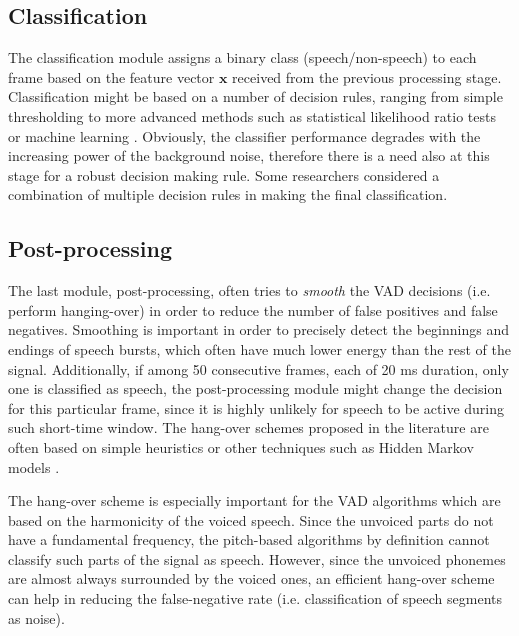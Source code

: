\subsection{Classification}

The classification module assigns a binary class (speech/non-speech) to each frame based on the feature vector $\mathbf{x}$ received from the previous processing stage. Classification might be based on a number of decision rules, ranging from simple thresholding \cite{G729} to more advanced methods such as statistical likelihood ratio tests \cite{Sohn, ImprovedLikelihood, SohnInitial} or machine learning \cite{XiaoLei, Stadtschnitzer}. Obviously, the classifier performance degrades with the increasing power of the background noise, therefore there is a need also at this stage for a robust decision making rule. Some researchers \cite{Kida} considered a combination of multiple decision rules in making the final classification.

\subsection{Post-processing}

The last module, post-processing, often tries to \emph{smooth} the VAD decisions (i.e. perform hanging-over) in order to reduce the number of false positives and false negatives. Smoothing is important in order to precisely detect the beginnings and endings of speech bursts, which often have much lower energy than the rest of the signal. Additionally, if among 50 consecutive frames, each of 20 ms duration, only one is classified as speech, the post-processing module might change the decision for this particular frame, since it is highly unlikely for speech to be active during such short-time window. The hang-over schemes  proposed in the literature are often based on simple heuristics \cite{G729} or other techniques such as Hidden Markov models \cite{Sohn}.

The hang-over scheme is especially important for the VAD algorithms which are based on the harmonicity of the voiced speech. Since the unvoiced parts do not have a fundamental frequency, the pitch-based algorithms by definition cannot classify such parts of the signal as speech. However, since the unvoiced phonemes are almost always surrounded by the voiced ones, an efficient hang-over scheme can help in reducing the false-negative rate (i.e. classification of speech segments as noise).


